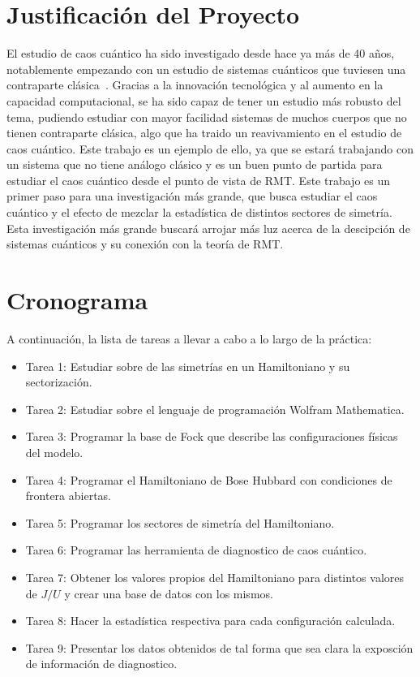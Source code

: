 \documentclass[spanish,titlepage,table]{practicas}
\begin{document}
\section{Justificación del Proyecto}
El estudio de caos cuántico ha sido investigado desde hace ya más de 40 años, notablemente empezando con un estudio de sistemas cuánticos
que tuviesen una contraparte clásica~\cite{Bohigas_1984}. Gracias a la innovación tecnológica y al aumento en la capacidad 
computacional, se ha sido capaz de tener un estudio más robusto del tema,
pudiendo estudiar con mayor facilidad sistemas de muchos cuerpos que no tienen contraparte clásica, algo que ha traido un reavivamiento en el estudio de caos cuántico. Este trabajo es un ejemplo de ello, ya que se estará trabajando con 
un sistema que no tiene análogo clásico y es un buen punto de partida para estudiar el caos cuántico desde el punto de vista de RMT.
Este trabajo es un primer paso para una investigación más grande, que busca estudiar el caos cuántico y el efecto de mezclar la estadística 
de distintos sectores de simetría. Esta investigación más grande buscará arrojar más luz acerca de la descipción de sistemas cuánticos y su conexión con la teoría de RMT.

\section{Cronograma}
A continuación, la lista de tareas a llevar a cabo a lo largo de la práctica:
\begin{itemize}
    \item Tarea 1: Estudiar sobre de las simetrías en un Hamiltoniano y su sectorización.
    \item Tarea 2: Estudiar sobre el lenguaje de programación Wolfram Mathematica.
    \item Tarea 3: Programar la base de Fock que describe las configuraciones físicas del modelo.
    \item Tarea 4: Programar el Hamiltoniano de Bose Hubbard con condiciones de frontera abiertas.
    \item Tarea 5: Programar los sectores de simetría del Hamiltoniano.
    \item Tarea 6: Programar las herramienta de diagnostico de caos cuántico. 
    \item Tarea 7: Obtener los valores propios del Hamiltoniano para distintos valores de $J/U$ y crear una base de datos con los mismos.
    \item Tarea 8: Hacer la estadística respectiva para cada configuración calculada.
    \item Tarea 9: Presentar los datos obtenidos de tal forma que sea clara la exposción de información de diagnostico.
\end{itemize}



\end{document}
